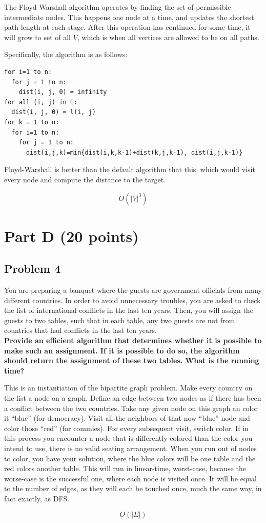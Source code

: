 \documentclass[11pt]{article}
\begin{document}
The Floyd-Warshall algorithm operates by finding the set of permissible
intermediate nodes. This happens one node at a time, and updates
the shortest path length at each stage. After this operation has
continued for some time, it will grow to set of all $V$, which is
when all vertices are allowed to be on all paths.

Specifically, the algorithm is as follows:

\begin{verbatim}
for i=1 to n: 
  for j = 1 to n:
    dist(i, j, 0) = infinity 
for all (i, j) in E:
  dist(i, j, 0) = l(i, j) 
for k = 1 to n:
  for i=1 to n: 
    for j = 1 to n:
      dist(i,j,k)=min{dist(i,k,k-1)+dist(k,j,k-1), dist(i,j,k-1)}
\end{verbatim}

Floyd-Warshall is better than the default algorithm that this, which would
visit every node and compute the distance to the target.

$$O(|V|^3)$$

\section*{Part D (20 points)}

\subsection*{Problem 4} You are preparing a banquet where the
guests are government officials from many different countries. In
order to avoid unnecessary troubles, you are asked to check the list
of international conflicts in the last ten years. Then, you will
assign the guests to two tables, such that in each table, any two
guests are not from countries that had conflicts in the last ten
years.\\

\noindent \textbf{Provide an efficient algorithm that determines whether it is
possible to make such an assignment. If it is possible to do so, the
algorithm should return the assignment of these two tables. What is
the running time?}

This is an instantiation of the bipartite graph problem. Make every country
on the list a node on a graph. Define an edge between two nodes as if there
has been a conflict between the two countries. Take any given node on this
graph an color it ``blue'' (for democracy). 
Visit all the neighbors of that now ``blue'' node and color those ``red''
(for commies). For every subsequent visit, switch color. If in this 
process you encounter a node that is differently colored than the color
you intend to use, there is no valid seating arrangement. When you run out
of nodes to color, you have your solution, where the blue colors will be one
table and the red colors another table. This will run in linear-time, worst-case,
because the worse-case is the successful one, where each node is visited once.
It will be equal to the number of edges, as they will each be touched once,
much the same way, in fact exactly, as DFS.

$$O(|E|)$$
\end{document}
